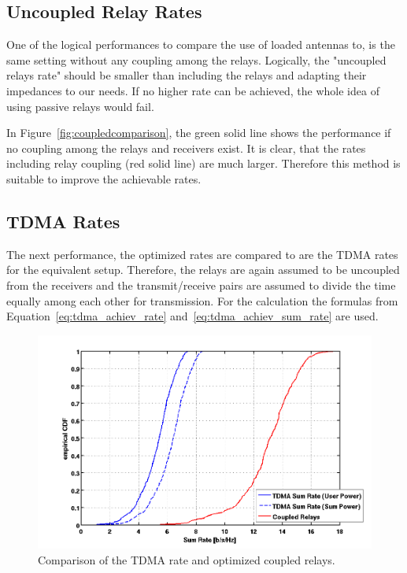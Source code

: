 \subsection{Uncoupled Relay Rates}
One of the logical performances to compare the use of loaded antennas to, is the same setting without any coupling among the relays.
Logically, the "uncoupled relays rate" should be smaller than including the relays and adapting their impedances to our needs.
If no higher rate can be achieved, the whole idea of using passive relays would fail.


In Figure~\ref{fig:coupledcomparison}, the green solid line shows the performance if no coupling among the relays and receivers exist.
It is clear, that the rates including relay coupling (red solid line) are much larger.
Therefore this method is suitable to improve the achievable rates.


\subsection{TDMA Rates}
The next performance, the optimized rates are compared to are the TDMA rates for the equivalent setup.
Therefore, the relays are again assumed to be uncoupled from the receivers and the transmit/receive pairs are assumed to divide the time equally among each other for transmission.
For the calculation the formulas from Equation~\eqref{eq:tdma_achiev_rate} and~\eqref{eq:tdma_achiev_sum_rate} are used.

\begin{figure}[h]
\centering
  \includegraphics[width=0.7\linewidth]{images/TDMAcomparison.png}
\caption{Comparison of the TDMA rate and optimized coupled relays.}
\label{fig:TDMAcomparison}
\end{figure}

